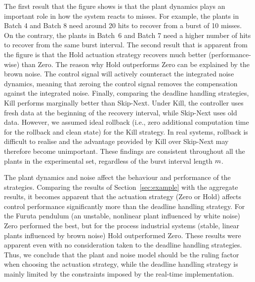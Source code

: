 The first result that the figure shows is that the plant dynamics plays an important role in how the system reacts to misses.
For example, the plants in Batch 4 and Batch 8 need around 20 hits to recover from a burst of 10 misses.
On the contrary, the plants in Batch~6 and Batch 7 need a higher number of hits to recover from the same burst interval.
The second result that is apparent from the figure is that the Hold actuation strategy recovers much better (performance-wise) than Zero.
The reason why Hold outperforms Zero can be explained by the brown noise.
The control signal will actively counteract the integrated noise dynamics, meaning that zeroing the control signal removes the compensation against the integrated noise.
%
Finally, comparing the deadline handling strategies, Kill performs marginally better than Skip-Next.
Under Kill, the controller uses fresh data at the beginning of the recovery interval, while Skip-Next uses old data.
However, we assumed ideal rollback (i.e., zero additional computation time for the rollback and clean state) for the Kill strategy.
In real systems, rollback is difficult to realise and the advantage provided by Kill over Skip-Next may therefore become unimportant.
%
These findings are consistent throughout all the plants in the experimental set, regardless of the burst interval length $m$.

The plant dynamics and noise affect the behaviour and performance of the strategies.
Comparing the results of Section~\ref{sec:example} with the aggregate results, it becomes apparent that the actuation strategy (Zero or Hold) affects control performance significantly more than the deadline handling strategy.
For the Furuta pendulum (an unstable, nonlinear plant influenced by white noise) Zero performed the best, but for the process industrial systems (stable, linear plants influenced by brown noise) Hold outperformed Zero.
These results were apparent even with no consideration taken to the deadline handling strategies.
Thus, we conclude that the plant and noise model should be the ruling factor when choosing the actuation strategy, while the deadline handling strategy is mainly limited by the constraints imposed by the real-time implementation.
